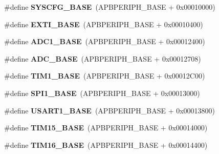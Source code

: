 \begin{DoxyCompactItemize}
\#define {\bfseries S\+Y\+S\+C\+F\+G\+\_\+\+B\+A\+SE}~(A\+P\+B\+P\+E\+R\+I\+P\+H\+\_\+\+B\+A\+SE + 0x00010000)
\item 
\mbox{\label{group___peripheral__memory__map_ga87371508b3bcdcd98cd1ec629be29061}} 
\#define {\bfseries E\+X\+T\+I\+\_\+\+B\+A\+SE}~(A\+P\+B\+P\+E\+R\+I\+P\+H\+\_\+\+B\+A\+SE + 0x00010400)
\item 
\mbox{\label{group___peripheral__memory__map_ga695c9a2f892363a1c942405c8d351b91}} 
\#define {\bfseries A\+D\+C1\+\_\+\+B\+A\+SE}~(A\+P\+B\+P\+E\+R\+I\+P\+H\+\_\+\+B\+A\+SE + 0x00012400)
\item 
\mbox{\label{group___peripheral__memory__map_gad06cb9e5985bd216a376f26f22303cd6}} 
\#define {\bfseries A\+D\+C\+\_\+\+B\+A\+SE}~(A\+P\+B\+P\+E\+R\+I\+P\+H\+\_\+\+B\+A\+SE + 0x00012708)
\item 
\mbox{\label{group___peripheral__memory__map_gaf8aa324ca5011b8173ab16585ed7324a}} 
\#define {\bfseries T\+I\+M1\+\_\+\+B\+A\+SE}~(A\+P\+B\+P\+E\+R\+I\+P\+H\+\_\+\+B\+A\+SE + 0x00012\+C00)
\item 
\mbox{\label{group___peripheral__memory__map_ga50cd8b47929f18b05efbd0f41253bf8d}} 
\#define {\bfseries S\+P\+I1\+\_\+\+B\+A\+SE}~(A\+P\+B\+P\+E\+R\+I\+P\+H\+\_\+\+B\+A\+SE + 0x00013000)
\item 
\mbox{\label{group___peripheral__memory__map_ga86162ab3f740db9026c1320d46938b4d}} 
\#define {\bfseries U\+S\+A\+R\+T1\+\_\+\+B\+A\+SE}~(A\+P\+B\+P\+E\+R\+I\+P\+H\+\_\+\+B\+A\+SE + 0x00013800)
\item 
\mbox{\label{group___peripheral__memory__map_ga7ab42ce1846930569d742d339b554078}} 
\#define {\bfseries T\+I\+M15\+\_\+\+B\+A\+SE}~(A\+P\+B\+P\+E\+R\+I\+P\+H\+\_\+\+B\+A\+SE + 0x00014000)
\item 
\mbox{\label{group___peripheral__memory__map_ga16c97093a531d763b0794c3e6d09e1bf}} 
\#define {\bfseries T\+I\+M16\+\_\+\+B\+A\+SE}~(A\+P\+B\+P\+E\+R\+I\+P\+H\+\_\+\+B\+A\+SE + 0x00014400)

\end{DoxyCompactItemize}
